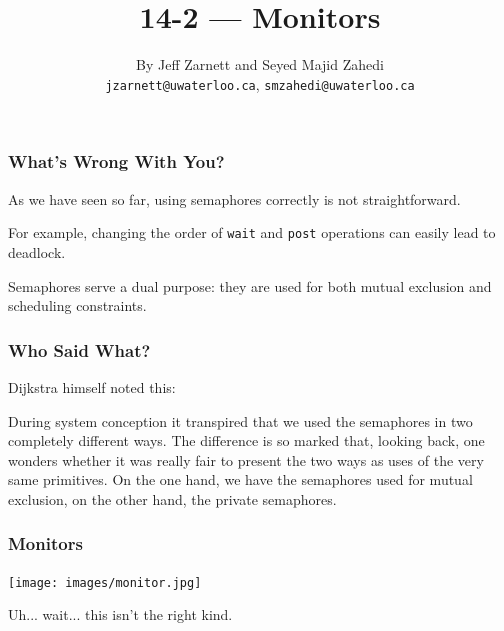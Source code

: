 

\title{14-2 --- Monitors }

\author{By Jeff Zarnett and Seyed Majid Zahedi \\ \small \texttt{jzarnett@uwaterloo.ca}, \texttt{smzahedi@uwaterloo.ca}}
\date{}




\begin{frame}
	\titlepage

\end{frame}

\begin{frame}
	\frametitle{What's Wrong With You?}

	As we have seen so far, using semaphores correctly is not straightforward.

	For example, changing the order of \texttt{wait} and \texttt{post} operations can easily lead to deadlock.

	Semaphores serve a dual purpose: they are used for both \alert{mutual exclusion} and \alert{scheduling constraints}.

\end{frame}

\begin{frame}
	\frametitle{Who Said What?}

	Dijkstra himself noted this:

	\vspace{1em}
	\begin{displayquote}
    	During system conception it transpired that we used the semaphores in two completely different ways.
    	The difference is so marked that, looking back, one wonders whether it was really fair to present the two ways as uses of the very same primitives.
    	On the one hand, we have the semaphores used for mutual exclusion, on the other hand, the private semaphores.
	\end{displayquote}

\end{frame}

\begin{frame}
	\frametitle{Monitors}
	\begin{center}
		\texttt{[image: images/monitor.jpg]}
	\end{center}

	Uh... wait... this isn't the right kind.

\end{frame}

